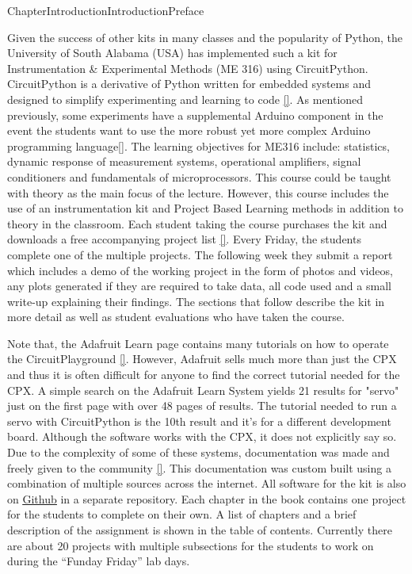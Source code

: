 \documentclass[oneside,10pt,]{book}
\newcommand{\xreffont}{\relax}
\newcommand{\linkhilite}[1]{\underline{#1}}
\numberwithin{equation}{section}
\begin{document}
\begin{chapterptx}{Chapter}{Introduction}{}{Introduction}{}{}{Preface}
\begin{introduction}{}
\par
Given the success of other kits in many classes and the popularity of Python, the University of South Alabama (USA) has implemented such a kit for Instrumentation \& Experimental Methods (ME 316) using CircuitPython. CircuitPython is a derivative of Python written for embedded systems and designed to simplify experimenting and learning to code \hyperlink{CircuitPython}{\linkhilite{[{\xreffont 30}]}}. As mentioned previously, some experiments have a supplemental Arduino component in the event the students want to use the more robust yet more complex Arduino programming language\hyperlink{Arduino}{\linkhilite{[{\xreffont 35}]}}. The learning objectives for ME316 include: statistics, dynamic response of measurement systems, operational amplifiers, signal conditioners and fundamentals of microprocessors. This course could be taught with theory as the main focus of the lecture. However, this course includes the use of an instrumentation kit and Project Based Learning methods in addition to theory in the classroom. Each student taking the course purchases the kit and downloads a free accompanying project list \hyperlink{Gitbook}{\linkhilite{[{\xreffont 31}]}}. Every Friday, the students complete one of the multiple projects. The following week they submit a report which includes a demo of the working project in the form of photos and videos, any plots generated if they are required to take data, all code used and a small write-up explaining their findings. The sections that follow describe the kit in more detail as well as student evaluations who have taken the course.%
\par
Note that, the Adafruit Learn page contains many tutorials on how to operate the CircuitPlayground \hyperlink{Adafruit}{\linkhilite{[{\xreffont 32}]}}. However, Adafruit sells much more than just the CPX and thus it is often difficult for anyone to find the correct tutorial needed for the CPX. A simple search on the Adafruit Learn System yields 21 results for "servo" just on the first page with over 48 pages of results. The tutorial needed to run a servo with CircuitPython is the 10th result and it's for a different development board. Although the software works with the CPX, it does not explicitly say so. Due to the complexity of some of these systems, documentation was made and freely given to the community \hyperlink{Gitbook}{\linkhilite{[{\xreffont 31}]}}. This documentation was custom built using a combination of multiple sources across the internet. All software for the kit is also on \href{www.github.com/cmontalvo251/Microcontrollers.git}{\linkhilite{Github}} in a separate repository. Each chapter in the book contains one project for the students to complete on their own. A list of chapters and a brief description of the assignment is shown in the table of contents. Currently there are about 20 projects with multiple subsections for the students to work on during the \textquotedblleft{}Funday Friday\textquotedblright{} lab days.%
\end{introduction}%
\end{chapterptx}
\end{document}
